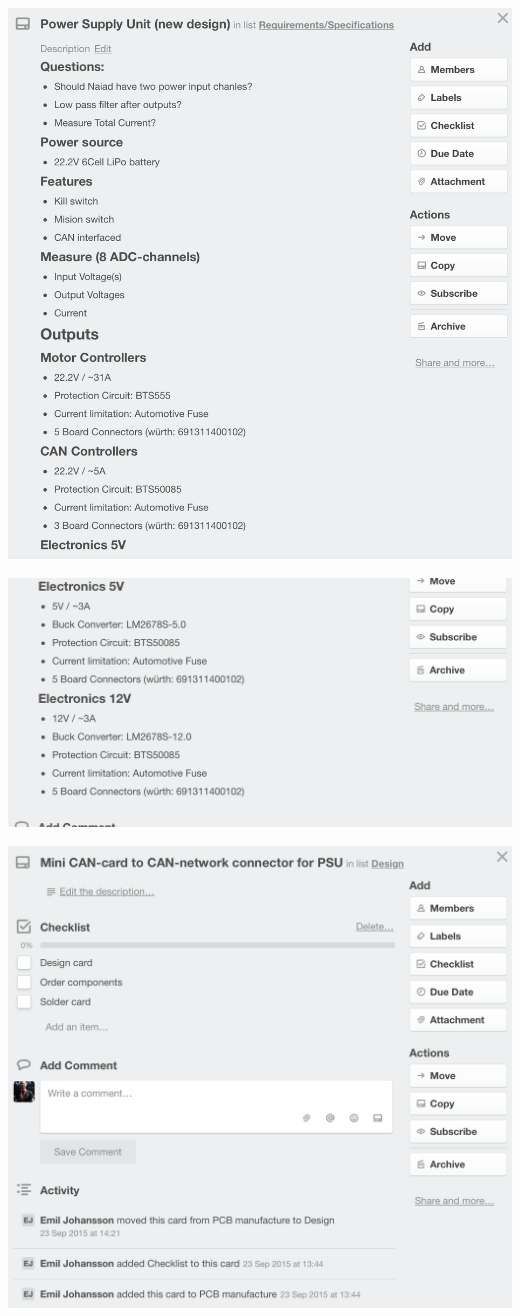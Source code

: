     \includegraphics[scale=0.5]{Screenshoot8}

    \includegraphics[scale=0.5]{Screenshoot9}

    \includegraphics[scale=0.5]{Screenshoot10}

